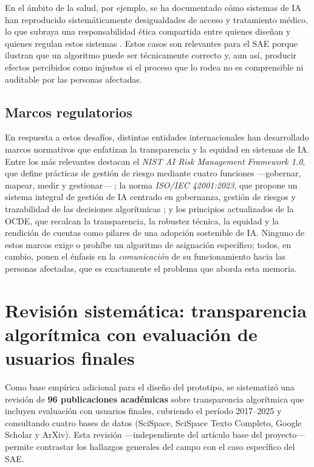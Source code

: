 En el ámbito de la salud, por ejemplo, se ha documentado cómo sistemas de IA han reproducido sistemáticamente desigualdades de acceso y tratamiento médico, lo que subraya una responsabilidad ética compartida entre quienes diseñan y quienes regulan estos sistemas \citep{rivas2024transparency}. Estos casos son relevantes para el SAE porque ilustran que un algoritmo puede ser técnicamente correcto y, aun así, producir efectos percibidos como injustos si el proceso que lo rodea no es comprensible ni auditable por las personas afectadas.

\subsection{Marcos regulatorios}

En respuesta a estos desafíos, distintas entidades internacionales han desarrollado marcos normativos que enfatizan la transparencia y la equidad en sistemas de IA. Entre los más relevantes destacan el \emph{NIST AI Risk Management Framework 1.0}, que define prácticas de gestión de riesgo mediante cuatro funciones —gobernar, mapear, medir y gestionar— \citep{nist2023airmf}; la norma \emph{ISO/IEC 42001:2023}, que propone un sistema integral de gestión de IA centrado en gobernanza, gestión de riesgos y trazabilidad de las decisiones algorítmicas \citep{iso2023aims}; y los principios actualizados de la OCDE, que recalcan la transparencia, la robustez técnica, la equidad y la rendición de cuentas como pilares de una adopción sostenible de IA. Ninguno de estos marcos exige o prohíbe un algoritmo de asignación específico; todos, en cambio, ponen el énfasis en la \emph{comunicación} de su funcionamiento hacia las personas afectadas, que es exactamente el problema que aborda esta memoria.

\section{Revisión sistemática: transparencia algorítmica con evaluación de usuarios finales}

Como base empírica adicional para el diseño del prototipo, se sistematizó una revisión de \textbf{96 publicaciones académicas} sobre transparencia algorítmica que incluyen evaluación con usuarios finales, cubriendo el período 2017--2025 y consultando cuatro bases de datos (SciSpace, SciSpace Texto Completo, Google Scholar y ArXiv). Esta revisión —independiente del artículo base del proyecto— permite contrastar los hallazgos generales del campo con el caso específico del SAE.

